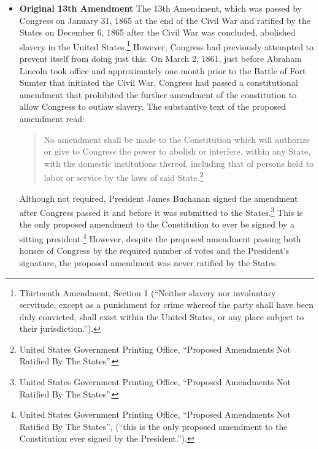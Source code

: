 \begin{itemize}
Therefore, in order to equalize the protection afforded under the Constitution for gender-based discrimination with other factors such as race and national origin, proponents drafted and proposed a constitutional amendment to affect this equalization.  The proposed amendment expressly prohibited gender-based discrimination under the law; the key text of the ERA said ``Equality of rights under the law shall not be denied or abridged by the United States or by any State on account of sex.''\footnote{United States Government Printing Office, ``Proposed Amendments Not Ratified By The States''.}
While the proposed Equal Rights Amendment has come up for consideration a number of times in the 20th Century, it has never been passed by both Congress and the States.  The closest it got was when the proposed amendment passed both houses of Congress in the 1970's but it fell short of the necessary State approval by 3 states.

\item \textbf{Original 13th Amendment}
The 13th Amendment, which was passed by Congress on January 31, 1865 at the end of the Civil War and ratified by the States on December 6, 1865 after the Civil War was concluded, abolished slavery in the United States.\footnote{Thirteenth Amendment, Section 1 (``Neither slavery nor involuntary servitude, except as a punishment for crime whereof the party shall have been duly convicted, shall exist within the United States, or any place subject to their jurisdiction.'').}  However, Congress had previously attempted to prevent itself from doing just this.  On March 2, 1861, just before Abraham Lincoln took office and approximately one month prior to the Battle of Fort Sumter that initiated the Civil War, Congress had passed a constitutional amendment that prohibited the further amendment of the constitution to allow Congress to outlaw slavery.  The substantive text of the proposed amendment read:

\begin{quote}
No amendment shall be made to the Constitution which will authorize or give to Congress the power to abolish or interfere, within any State, with the domestic institutions thereof, including that of persons held to labor or service by the laws of said State.\footnote{United States Government Printing Office, ``Proposed Amendments Not Ratified By The States''.}
\end{quote}

Although not required, President James Buchanan signed the amendment after Congress passed it and before it was submitted to the States.\footnote{United States Government Printing Office, ``Proposed Amendments Not Ratified By The States''.}  This is the only proposed amendment to the Constitution to ever be signed by a sitting president.\footnote{United States Government Printing Office, ``Proposed Amendments Not Ratified By The States'', (``this is the only proposed amendment to the Constitution ever signed by the President.'').}  However, despite the proposed amendment passing both houses of Congress by the required number of votes and the President's signature, the proposed amendment was never ratified by the States.  
\end{itemize}


